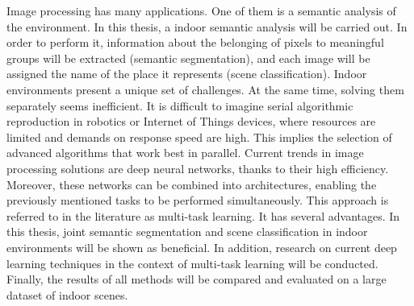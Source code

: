 Image processing has many applications. One of them is a semantic analysis of the environment. In this thesis, a indoor semantic analysis will be carried out. In order to perform it, information about the belonging of pixels to meaningful groups will be extracted (semantic segmentation), and each image will be assigned the name of the place it represents (scene classification). Indoor environments present a unique set of challenges. At the same time, solving them separately seems inefficient. It is difficult to imagine serial algorithmic reproduction in robotics or Internet of Things devices, where resources are limited and demands on response speed are high. This implies the selection of advanced algorithms that work best in parallel. Current trends in image processing solutions are deep neural networks, thanks to their high efficiency. Moreover, these networks can be combined into architectures, enabling the previously mentioned tasks to be performed simultaneously. This approach is referred to in the literature as multi-task learning. It has several advantages. In this thesis, joint semantic segmentation and scene classification in indoor environments will be shown as beneficial. In addition, research on current deep learning techniques in the context of multi-task learning will be conducted. Finally, the results of all methods will be compared and evaluated on a large dataset of indoor scenes.